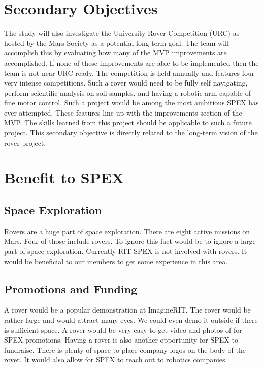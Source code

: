 \documentclass[conference]{IEEEtran} %
\begin{document}
\section{Secondary Objectives}
\label{sec:secondary-obj}
The study will also investigate the University Rover Competition (URC) as hosted by the Mars Society as a potential long term goal. 
The team will accomplish this by evaluating how many of the MVP improvements are accomplished. 
If none of these improvements are able to be implemented then the team is not near URC ready.
The competition is held annually and features four very intense competitions. 
Such a rover would need to be fully self navigating, perform scientific analysis on soil samples, and having a robotic arm capable of fine motor control. 
Such a project would be among the most ambitious SPEX has ever attempted. 
These features line up with the improvements section of the MVP.
The skills learned from this project should be applicable to such a future project. 
This secondary objective is directly related to the long-term vision of the rover project. 

\section{Benefit to SPEX}
\label{sec:benefit}

\subsection{Space Exploration}
\label{subsec:spacex}
Rovers are a huge part of space exploration. 
There are eight active missions on Mars. 
Four of those include rovers. 
To ignore this fact would be to ignore a large part of space exploration.
Currently RIT SPEX is not involved with rovers.
It would be beneficial to our members to get some experience in this area.

\subsection{Promotions and Funding}
\label{subsec:promos}
A rover would be a popular demonstration at ImagineRIT.
The rover would be rather large and would attract many eyes. 
We could even demo it outside if there is sufficient space. 
A rover would be very easy to get video and photos of for SPEX promotions. 
Having a rover is also another opportunity for SPEX to fundraise. 
There is plenty of space to place company logos on the body of the rover. 
It would also allow for SPEX to reach out to robotics companies.
\end{document}
